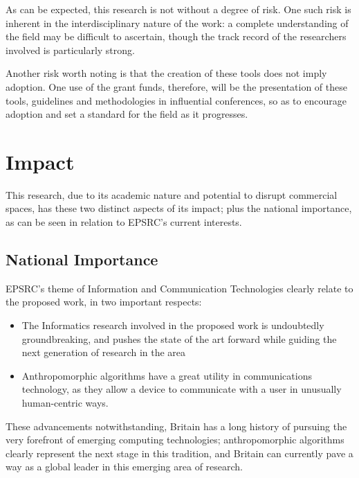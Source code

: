 
As can be expected, this research is not without a degree of risk. One such risk is inherent in the interdisciplinary nature of the work: a complete understanding of the field may be difficult to ascertain, though the track record of the researchers involved is particularly strong.\par

Another risk worth noting is that the creation of these tools does not imply adoption. One use of the grant funds, therefore, will be the presentation of these tools, guidelines and methodologies in influential conferences, so as to encourage adoption and set a standard for the field as it progresses.\par

\section{Impact}
\label{sec:proposed_approach}
This research, due to its academic nature and potential to disrupt commercial spaces, has these two distinct aspects of its impact; plus the national importance, as can be seen in relation to EPSRC's current interests.

\subsection{National Importance}
\label{sec:national_importance}
EPSRC's theme of Information and Communication Technologies clearly relate to the proposed work, in two important respects:
\begin{itemize}
    \item The Informatics research involved in the proposed work is undoubtedly groundbreaking, and pushes the state of the art forward while guiding the next generation of research in the area
    \item Anthropomorphic algorithms have a great utility in communications technology, as they allow a device to communicate with a user in unusually human-centric ways.\cite{Crawford2013127}
\end{itemize}

These advancements notwithstanding, Britain has a long history of pursuing the very forefront of emerging computing technologies; anthropomorphic algorithms clearly represent the next stage in this tradition, and Britain can currently pave a way as a global leader in this emerging area of research.


